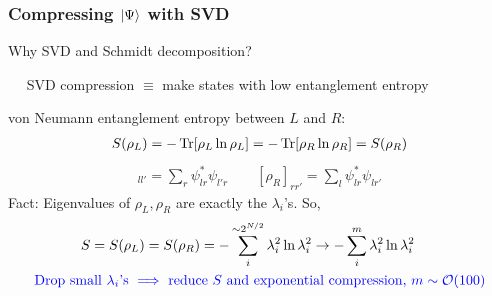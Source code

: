 \documentclass{beamer}
\theoremstyle{definition}
\begin{document}
\begin{frame}
	\frametitle{Compressing $\ket{\Psi}$ with SVD}
	
	Why SVD and Schmidt decomposition? \\
	
	\vspace{8pt}
	
	$\quad$ SVD compression $\equiv$ make states with low entanglement entropy\\
	
	\vspace{8pt}
	
	von Neumann entanglement entropy between $L$ and $R$:
	\begin{align*}
		S(\rho_L) = -\Tr[\rho_L \ln \rho_L] = -\Tr[\rho_R \ln \rho_R] = S(\rho_R) 
	\end{align*}
	\begin{align*}
		[\rho_L]_{ll'} = \sum_r \psi^*_{lr}\psi_{l'r} \quad\quad [\rho_R]_{rr'} = \sum_l \psi^*_{lr}\psi_{lr'}
	\end{align*}
	Fact: Eigenvalues of $\rho_L, \rho_R$ are exactly the $\lambda_i$'s. So,
	\vspace{-7pt}
	\begin{align*}
		&\quad\quad \quad \,\, S = S(\rho_L) = S(\rho_R) = -\sum_i^{\sim 2^{N/2}} \lambda_i^2 \ln \lambda_i^2 \to -\sum_i^m \lambda_i^2 \ln \lambda_i^2\\
		&\text{\textcolor{blue}{Drop small $\lambda_i$'s $\implies$ reduce $S$ and exponential compression, $m\sim \mathcal{O}(100)$}}
	\end{align*}
	
\end{frame}
\end{document}
